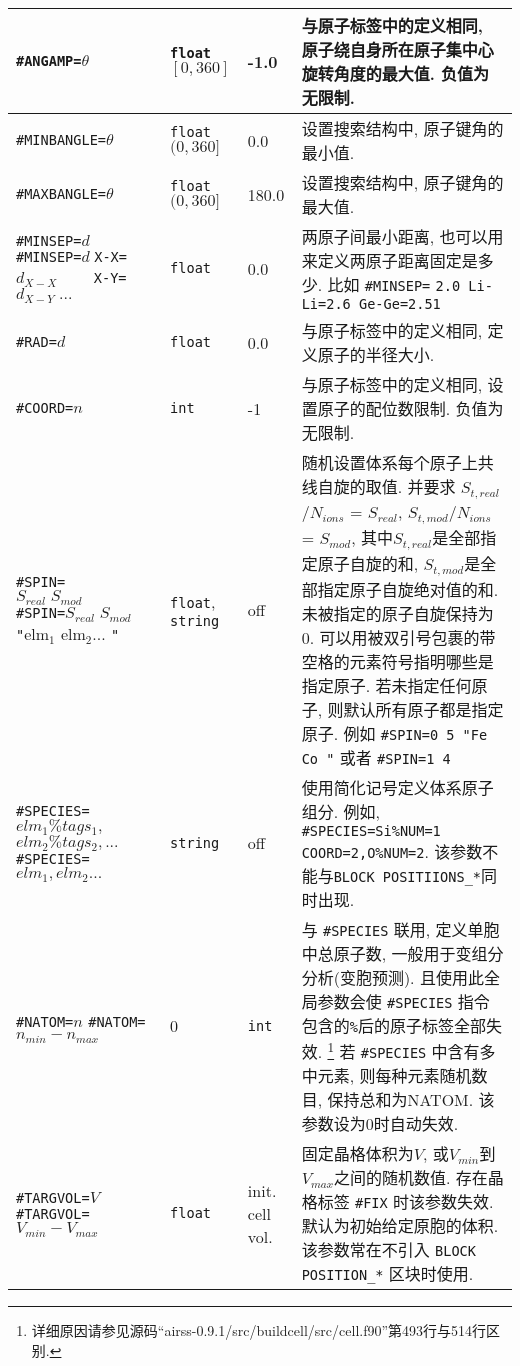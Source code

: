 \documentclass[a4paper, 10pt]{article}
\begin{document}
\begin{center}
\begin{longtable}{m{11em}|m{4em}<{\centering}|m{3em}<{\centering}|m{15em}}
\midrule
\verb|#ANGAMP=|\(\theta\)& \verb|float| \([0,360]\) & -1.0 & 与原子标签中的定义相同, 原子绕自身所在\textbf{原子集}中心旋转角度的最大值. 负值为无限制.\\
\midrule
\verb|#MINBANGLE=|\(\theta\) & \verb|float| \((0,360]\) & 0.0 & 设置搜索结构中, 原子键角的最小值.\\
\midrule
\verb|#MAXBANGLE=|\(\theta\) & \verb|float| \((0,360]\) & 180.0 &设置搜索结构中, 原子键角的最大值.\\
\midrule
\verb|#MINSEP=|\(d\) \verb|#MINSEP=|\(d\;\)\verb|X-X=|\(d_{X−X}\;\)\ \ \  \ \verb|X-Y=|\(d_{X−Y}\;...\) & \verb|float| & 0.0 & 两原子间最小距离, 也可以用来定义两原子距离固定是多少. 比如 \verb|#MINSEP=| \verb|2.0 Li-Li=2.6 Ge-Ge=2.51|\\
\midrule
\verb|#RAD=|\(d\)& \verb|float|  & 0.0 & 与原子标签中的定义相同, 定义原子的半径大小.\\
\midrule
\verb|#COORD=|\(n\)& \verb|int| & -1 & 与原子标签中的定义相同, 设置原子的配位数限制. 负值为无限制.\\
\midrule
\verb|#SPIN=|\(S_{real}\;S_{mod}\;\;\;\;\;\;\) \verb|#SPIN=|\(S_{real}\;S_{mod}\;\;\;\;\;\) \verb|"|elm\(_1\) elm\(_2\)... \verb|"| & \verb|float|,  \verb|string|& off & 随机设置体系每个原子上共线自旋的取值. 并要求 \(S_{t,real}\)/\(N_{ions}\) = \(S_{real}\), \(S_{t,mod}\)/\(N_{ions}\) = \(S_{mod}\), 其中\(S_{t,real}\)是全部指定原子自旋的和, \(S_{t,mod}\)是全部指定原子自旋绝对值的和. 未被指定的原子自旋保持为0. 可以用被双引号包裹的带空格的元素符号指明哪些是指定原子. 若未指定任何原子, 则默认所有原子都是指定原子. 例如 \verb|#SPIN=0 5 "Fe Co "| 或者 \verb|#SPIN=1 4| \\
\midrule
\verb|#SPECIES=|\(elm_1\%tags_1,\) \(elm_2\%tags_2,...\;\;\;\;\;\;\) \verb|#SPECIES=|\(elm_1,elm_2...\) & \verb|string|  & off & 使用简化记号定义体系原子组分. 例如, \verb|#SPECIES=Si|\verb|%NUM=1| \verb|COORD=2,|\verb|O%NUM=2|. 该参数不能与\verb|BLOCK POSITIIONS_*|同时出现.\\
\midrule
\verb|#NATOM=|\(n\) \hspace{6em}\verb|#NATOM=|\(n_{min}-n_{max}\)  & 0 & \verb|int| & 与 \verb|#SPECIES| 联用, 定义单胞中总原子数, 一般用于变组分分析(变胞预测). 且使用此全局参数会使 \verb|#SPECIES| 指令包含的\verb|%|后的原子标签全部失效. \footnote{详细原因请参见源码``airss-0.9.1/src/buildcell/src/cell.f90''第493行与514行区别.} 若 \verb|#SPECIES| 中含有多中元素, 则每种元素随机数目, 保持总和为NATOM. 该参数设为0时自动失效.\\
\midrule
\verb|#TARGVOL=|\(V\) \verb|#TARGVOL=|\(V_{min}-V_{max}\) & \verb|float| & init. cell vol. & 固定晶格体积为\(V\), 或\(V_{min}\)到\(V_{max}\)之间的随机数值. 存在晶格标签 \verb|#FIX| 时该参数失效. 默认为初始给定原胞的体积. 该参数常在不引入 \verb|BLOCK POSITION_*| 区块时使用.\\

\end{longtable}
\end{center}
\end{document}
